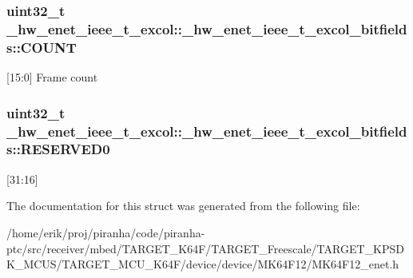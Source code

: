 \subsubsection[{\texorpdfstring{C\+O\+U\+NT}{COUNT}}]{\setlength{\rightskip}{0pt plus 5cm}uint32\+\_\+t \+\_\+hw\+\_\+enet\+\_\+ieee\+\_\+t\+\_\+excol\+::\+\_\+hw\+\_\+enet\+\_\+ieee\+\_\+t\+\_\+excol\+\_\+bitfields\+::\+C\+O\+U\+NT}\hypertarget{struct__hw__enet__ieee__t__excol_1_1__hw__enet__ieee__t__excol__bitfields_a4bdeb05c33b9209d36a4e643b5fc9ff1}{}\label{struct__hw__enet__ieee__t__excol_1_1__hw__enet__ieee__t__excol__bitfields_a4bdeb05c33b9209d36a4e643b5fc9ff1}
\mbox{[}15\+:0\mbox{]} Frame count 
\subsubsection[{\texorpdfstring{R\+E\+S\+E\+R\+V\+E\+D0}{RESERVED0}}]{\setlength{\rightskip}{0pt plus 5cm}uint32\+\_\+t \+\_\+hw\+\_\+enet\+\_\+ieee\+\_\+t\+\_\+excol\+::\+\_\+hw\+\_\+enet\+\_\+ieee\+\_\+t\+\_\+excol\+\_\+bitfields\+::\+R\+E\+S\+E\+R\+V\+E\+D0}\hypertarget{struct__hw__enet__ieee__t__excol_1_1__hw__enet__ieee__t__excol__bitfields_aa306227d7a2c045ee22300d61a50d27e}{}\label{struct__hw__enet__ieee__t__excol_1_1__hw__enet__ieee__t__excol__bitfields_aa306227d7a2c045ee22300d61a50d27e}
\mbox{[}31\+:16\mbox{]} 

The documentation for this struct was generated from the following file\+:\begin{DoxyCompactItemize}
\item 
/home/erik/proj/piranha/code/piranha-\/ptc/src/receiver/mbed/\+T\+A\+R\+G\+E\+T\+\_\+\+K64\+F/\+T\+A\+R\+G\+E\+T\+\_\+\+Freescale/\+T\+A\+R\+G\+E\+T\+\_\+\+K\+P\+S\+D\+K\+\_\+\+M\+C\+U\+S/\+T\+A\+R\+G\+E\+T\+\_\+\+M\+C\+U\+\_\+\+K64\+F/device/device/\+M\+K64\+F12/M\+K64\+F12\+\_\+enet.\+h\end{DoxyCompactItemize}
